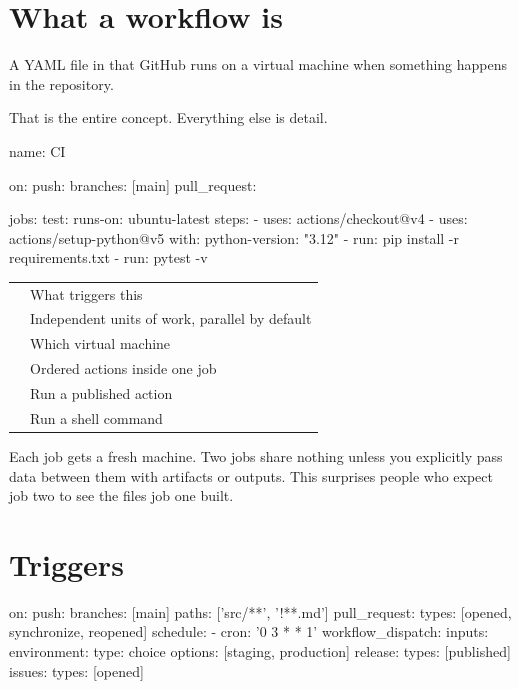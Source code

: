 \documentclass[11pt]{article}
\begin{document}
\maketitlepage

\section{What a workflow is}

A YAML file in  that GitHub runs on a virtual machine when
something happens in the repository.

That is the entire concept. Everything else is detail.

\begin{terminal}
name: CI

on:
  push:
    branches: [main]
  pull_request:

jobs:
  test:
    runs-on: ubuntu-latest
    steps:
      - uses: actions/checkout@v4
      - uses: actions/setup-python@v5
        with:
          python-version: "3.12"
      - run: pip install -r requirements.txt
      - run: pytest -v
\end{terminal}

\vspace{0.5em}
\begin{tabularx}{\linewidth}{@{}L{2.4cm} X@{}}
\toprule
{} &  \\
\midrule
{} & What triggers this \\
 & Independent units of work, parallel by default \\
 & Which virtual machine \\
 & Ordered actions inside one job \\
 & Run a published action \\
 & Run a shell command \\
\bottomrule
\end{tabularx}
\vspace{0.5em}

\begin{note}
Each job gets a fresh machine. Two jobs share nothing unless you explicitly pass
data between them with artifacts or outputs. This surprises people who expect job
two to see the files job one built.
\end{note}

\section{Triggers}

\begin{terminal}
on:
  push:
    branches: [main]
    paths: ['src/**', '!**.md']
  pull_request:
    types: [opened, synchronize, reopened]
  schedule:
    - cron: '0 3 * * 1'
  workflow_dispatch:
    inputs:
      environment:
        type: choice
        options: [staging, production]
  release:
    types: [published]
  issues:
    types: [opened]
\end{terminal}
\end{document}
